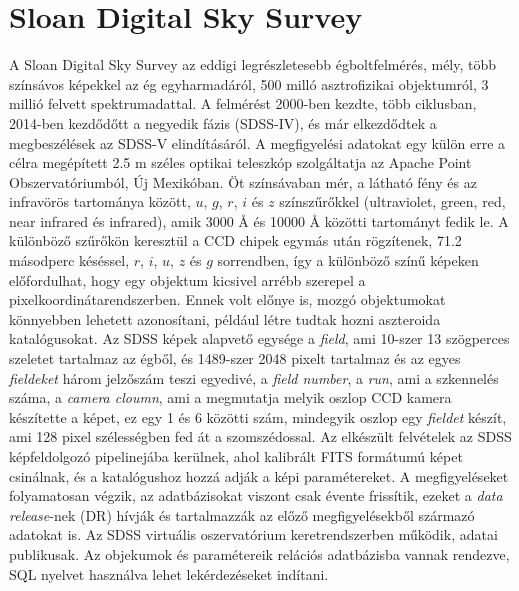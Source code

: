 \documentclass[12pt,letterpaper,oneside,openright]{book}
\begin{document}
 \section{Sloan Digital Sky Survey}
 A Sloan Digital Sky Survey az eddigi legrészletesebb égboltfelmérés, mély, több színsávos képekkel az ég egyharmadáról, 500 milló asztrofizikai objektumról, 3 millió felvett spektrumadattal. A felmérést 2000-ben kezdte, több ciklusban, 2014-ben kezdődőtt a negyedik fázis (SDSS-IV), és már elkezdődtek a megbeszélések az SDSS-V elindításáról\cite{sdssV}. A megfigyelési adatokat egy külön erre a célra megépített 2.5 m széles optikai teleszkóp szolgáltatja az Apache Point Obszervatóriumból, Új Mexikóban.
 Öt színsávaban mér, a látható fény és az infravörös tartománya között,  $u$, $g$, $r$, $i$ és $z$ színszűrőkkel (ultraviolet, green, red, near infrared és infrared), amik 3000 \AA\text{ }  és 10000 \AA\text{ }  közötti tartományt fedik le. A különböző szűrőkön keresztül a CCD chipek egymás után rögzítenek, 71.2 másodperc késéssel, $r$, $i$, $u$, $z$ és $g$ sorrendben, így a különböző színű képeken előfordulhat, hogy egy objektum kicsivel arrébb szerepel a pixelkoordinátarendszerben. Ennek volt előnye is, mozgó objektumokat könnyebben lehetett azonosítani, például létre tudtak hozni aszteroida katalógusokat. Az SDSS képek alapvető egysége a \textit{field}, ami 10-szer 13 szögperces szeletet tartalmaz az égből, és 1489-szer 2048 pixelt tartalmaz és az egyes \textit{fieldeket} három jelzőszám teszi egyedivé, a \textit{field number},  a \textit{run}, ami a szkennelés száma, a \textit{camera cloumn}, ami a megmutatja melyik oszlop CCD kamera készítette a képet, ez egy 1 és 6 közötti szám, mindegyik oszlop egy \textit{fieldet} készít, ami 128 pixel szélességben fed át a szomszédossal.  Az elkészült felvételek az SDSS képfeldolgozó pipelinejába kerülnek, ahol kalibrált FITS formátumú képet csinálnak, és a katalógushoz hozzá adják a képi paramétereket.
 \newline \indent
 A megfigyeléseket folyamatosan végzik, az adatbázisokat viszont csak évente frissítik, ezeket a \textit{data release}-nek (DR) hívják és tartalmazzák az előző megfigyelésekből származó adatokat is. Az SDSS virtuális oszervatórium keretrendszerben működik, adatai publikusak. Az objekumok és paramétereik relációs adatbázisba vannak rendezve, SQL nyelvet használva lehet lekérdezéseket indítani.
\end{document}
